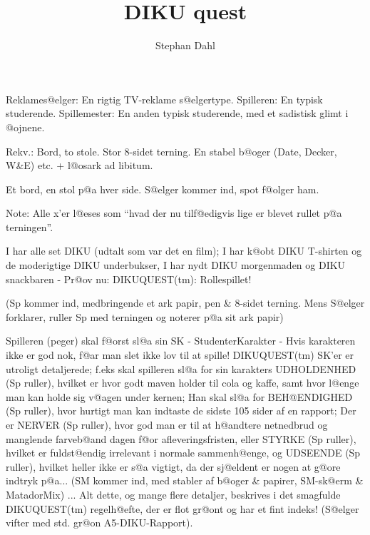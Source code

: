 \documentclass[a4paper,11pt]{article}
\begin{document}
\title{DIKU quest}

\author{Stephan Dahl}


\maketitle

\begin{roles}

 Reklames@elger: En rigtig TV-reklame s@elgertype.
 Spilleren: En typisk studerende.
 Spillemester: En anden typisk studerende, med et sadistisk
glimt i @ojnene.

\end{roles}

\begin{sketch}




Rekv.:	Bord, to stole. Stor 8-sidet terning. En stabel b@oger (Date, Decker,
W\&E) etc. + l@osark ad libitum.

\scene	Et bord, en stol p@a hver side. S@elger kommer ind, spot f@olger ham.

Note:	Alle x'er l@eses som ``hvad der nu tilf@edigvis lige er blevet rullet p@a
terningen''.


	I har alle set DIKU (udtalt som var det en film); I har k@obt
DIKU T-shirten og de moderigtige DIKU underbukser, I har nydt DIKU
morgenmaden og DIKU snackbaren - Pr@ov nu: DIKUQUEST(tm): Rollespillet!

(Sp kommer ind, medbringende et ark papir, pen \& 8-sidet terning. Mens S@elger
forklarer, ruller Sp med terningen og noterer p@a sit ark papir)

	Spilleren (peger) skal f@orst sl@a sin SK -
StudenterKarakter - Hvis karakteren ikke er god nok, f@ar man slet
ikke lov til at spille!  DIKUQUEST(tm) SK'er er utroligt detaljerede;
f.eks skal spilleren sl@a for sin karakters UDHOLDENHED (Sp ruller),
hvilket er hvor godt maven holder til cola og kaffe, samt hvor l@enge
man kan holde sig v@agen under kernen; Han skal sl@a for BEH@ENDIGHED
(Sp ruller), hvor hurtigt man kan indtaste de sidste 105 sider af en
rapport; Der er NERVER (Sp ruller), hvor god man er til at h@andtere
netnedbrud og manglende farveb@and dagen f@or afleveringsfristen,
eller STYRKE (Sp ruller), hvilket er fuldst@endig irrelevant i normale
sammenh@enge, og UDSEENDE (Sp ruller), hvilket heller ikke er s@a
vigtigt, da der sj@eldent er nogen at g@ore indtryk p@a... (SM kommer
ind, med stabler af b@oger \& papirer, SM-sk@erm \& MatadorMix) ...
Alt dette, og mange flere detaljer, beskrives i det smagfulde
DIKUQUEST(tm) regelh@efte, der er flot gr@ont og har et fint indeks!
(S@elger vifter med std. gr@on A5-DIKU-Rapport).


\end{sketch}
\end{document}
